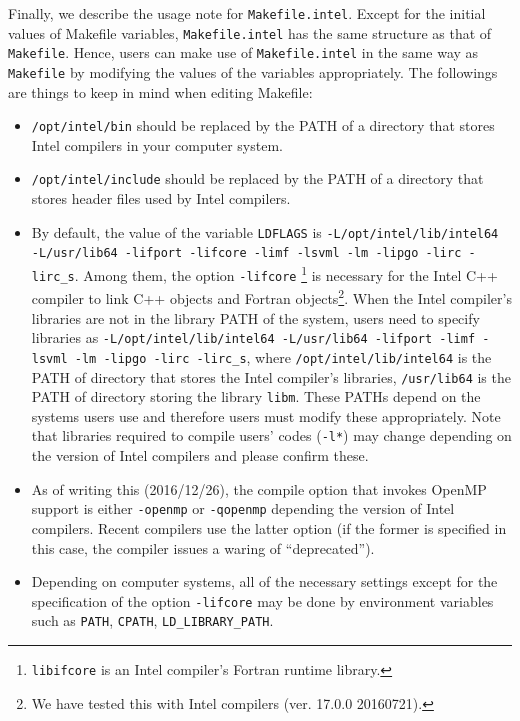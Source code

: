 Finally, we describe the usage note for \texttt{Makefile.intel}. Except for the initial values of Makefile variables, \texttt{Makefile.intel} has the same structure as that of \texttt{Makefile}. Hence, users can make use of \texttt{Makefile.intel} in the same way as \texttt{Makefile} by modifying the values of the variables appropriately. The followings are things to keep in mind when editing Makefile:
\begin{itemize}[leftmargin=*]
\item \texttt{/opt/intel/bin} should be replaced by the PATH of a directory that stores Intel compilers in your computer system.
\item \texttt{/opt/intel/include} should be replaced by the PATH of a directory that stores header files used by Intel compilers.
\item By default, the value of the variable \texttt{LDFLAGS} is \texttt{-L/opt/intel/lib/intel64 -L/usr/lib64 -lifport -lifcore -limf -lsvml -lm -lipgo -lirc -lirc\_s}. Among them, the option \texttt{-lifcore} \footnote{\texttt{libifcore} is an Intel compiler's Fortran runtime library.} is necessary for the Intel C++ compiler to link C++ objects and Fortran objects\footnote{We have tested this with Intel compilers (ver. 17.0.0 20160721).}. When the Intel compiler's libraries are not in the library PATH of the system, users need to specify libraries as \texttt{-L/opt/intel/lib/intel64 -L/usr/lib64 -lifport -limf -lsvml -lm -lipgo -lirc -lirc\_s}, where \texttt{/opt/intel/lib/intel64} is the PATH of directory that stores the Intel compiler's libraries, \texttt{/usr/lib64} is the PATH of directory storing the library \texttt{libm}. These PATHs depend on the systems users use and therefore users must modify these appropriately. Note that libraries required to compile users' codes (\texttt{-l*}) may change depending on the version of Intel compilers and please confirm these.
\item As of writing this (2016/12/26), the compile option that invokes OpenMP support is either \texttt{-openmp} or \texttt{-qopenmp} depending the version of Intel compilers. Recent compilers use the latter option (if the former is specified in this case, the compiler issues a waring of ``deprecated'').
\item Depending on computer systems, all of the necessary settings except for the specification of the option \texttt{-lifcore} may be done by environment variables such as \texttt{PATH}, \texttt{CPATH}, \texttt{LD\_LIBRARY\_PATH}.
\end{itemize}
